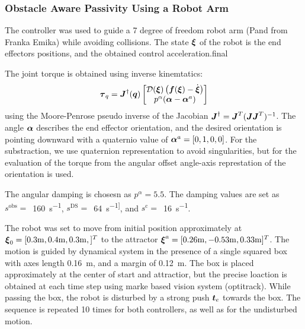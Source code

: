 \subsubsection{Obstacle Aware Passivity Using a Robot Arm}
The controller was used to guide a 7 degree of freedom robot arm (Pand from Franka Emika) while avoiding collisions. The state $\boldsymbol{\xi}$ of the robot is the end effectors positions, and the obtained control acceleration.final 

The joint torque is obtained using inverse kinemtatics:
\begin{equation}
	\boldsymbol{\tau}_q = \boldsymbol{J}^{\dag}(\boldsymbol{q}) 
	\begin{bmatrix} \mathcal{D}(\boldsymbol{\xi}) \left( \boldsymbol{f}(\boldsymbol{\xi}) - \dot{\boldsymbol{\xi}} \right) \\  p^\alpha (\boldsymbol{\alpha} - \boldsymbol{\alpha}^a) \end{bmatrix}
\end{equation}
using the Moore-Penrose pseudo inverse of the Jacobian $\boldsymbol{J}^{\dag} = \boldsymbol{J}^T (\boldsymbol{J} \boldsymbol{J}^T)^{-1}$. The angle $\boldsymbol{\alpha}$ describes the end effector orientation, and the desired orientation is pointing downward with a quaternio value of $\boldsymbol{\alpha}^a = [0, 1, 0, 0]$. For the substraction, we use quaternion representation to avoid singularities, but for the evaluation of the torque from the angular offset angle-axis represtation of the orientation is used.

The angular damping is chosesn as $p^\alpha = 5.5$.
The damping values are set as
$s^{\mathrm{obs}}=\, $ \qty{160}{s^{-1}},
$s^{\mathrm{DS}}= \,$ \qty{64}{s^{-1]}}, and
$s^{\mathrm{c}}= \,$ \qty{16}{s^{-1}}.


The robot was set to move from initial position approximately at $\boldsymbol{\xi}_0 = [0.3\mathrm{m}, 0.4\mathrm{m}, 0.3\mathrm{m},]^T$ to the attractor $\boldsymbol{\xi}^a = [0.26 \mathrm{m}, -0.53\mathrm{m}, 0.33\mathrm{m}]^T$.
The motion is guided by dynamical system in the presence of a single squared box with axes length \qty{0.16}{m}, and a margin of \qty{0.12}{m}. The box is placed approximately at the center of start and attractior, but the precise loaction  is obtained at each time step using marke based vision system (optitrack). 
While passing the box, the robot is disturbed by a strong push $\boldsymbol{t}_e$ towards the box. The sequence is repeated 10 times for both controllers, as well as for the undisturbed motion.

